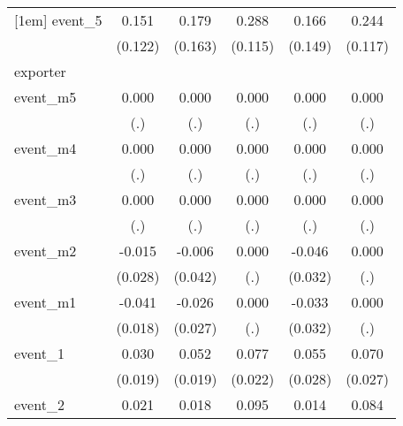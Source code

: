{\begin{tabular}{l*{5}{c}}
[1em]
event\_5     &       0.151         &       0.179         &       0.288\sym{*}  &       0.166         &       0.244\sym{*}  \\
            &     (0.122)         &     (0.163)         &     (0.115)         &     (0.149)         &     (0.117)         \\
\hline
exporter    &                     &                     &                     &                     &                     \\
event\_m5    &       0.000         &       0.000         &       0.000         &       0.000         &       0.000         \\
            &         (.)         &         (.)         &         (.)         &         (.)         &         (.)         \\
[1em]
event\_m4    &       0.000         &       0.000         &       0.000         &       0.000         &       0.000         \\
            &         (.)         &         (.)         &         (.)         &         (.)         &         (.)         \\
[1em]
event\_m3    &       0.000         &       0.000         &       0.000         &       0.000         &       0.000         \\
            &         (.)         &         (.)         &         (.)         &         (.)         &         (.)         \\
[1em]
event\_m2    &      -0.015         &      -0.006         &       0.000         &      -0.046         &       0.000         \\
            &     (0.028)         &     (0.042)         &         (.)         &     (0.032)         &         (.)         \\
[1em]
event\_m1    &      -0.041\sym{*}  &      -0.026         &       0.000         &      -0.033         &       0.000         \\
            &     (0.018)         &     (0.027)         &         (.)         &     (0.032)         &         (.)         \\
[1em]
event\_1     &       0.030         &       0.052\sym{**} &       0.077\sym{***}&       0.055         &       0.070\sym{*}  \\
            &     (0.019)         &     (0.019)         &     (0.022)         &     (0.028)         &     (0.027)         \\
[1em]
event\_2     &       0.021         &       0.018         &       0.095\sym{***}&       0.014         &       0.084\sym{**} \\

\end{tabular}}
